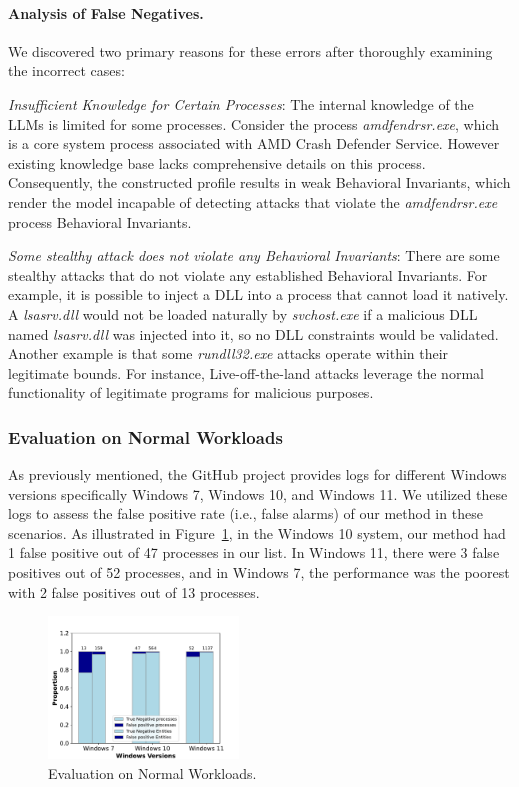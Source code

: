 \paragraph{Analysis of False Negatives.}
We discovered two primary reasons for these errors after thoroughly examining the incorrect cases:


\textit{Insufficient Knowledge for Certain Processes}:  The internal knowledge of the LLMs is limited for some processes. Consider the process \textit{amdfendrsr.exe}, which is a core system process associated with AMD Crash Defender Service. However existing knowledge base lacks comprehensive details on this process. Consequently, the constructed profile results in weak Behavioral Invariants, which render the model incapable of detecting attacks that violate the \textit{amdfendrsr.exe} process Behavioral Invariants.

\textit{Some stealthy attack does not violate any Behavioral Invariants}: There are some stealthy attacks that do not violate any established Behavioral Invariants. For example, it is possible to inject a DLL into a process that cannot load it natively. A \textit{lsasrv.dll} would not be loaded naturally by \textit{svchost.exe} if a malicious DLL named \textit{lsasrv.dll} was injected into it, so no DLL constraints would be validated. Another example is that some \textit{rundll32.exe} attacks operate within their legitimate bounds. For instance, Live-off-the-land\cite{barr2021survivalism} attacks leverage the normal functionality of legitimate programs for malicious purposes.




\subsubsection{Evaluation on Normal Workloads}
As previously mentioned, the GitHub project \cite{evtx-baseline2022} provides logs for different Windows versions specifically Windows 7, Windows 10, and Windows 11. We utilized these logs to assess the false positive rate (i.e., false alarms) of our method in these scenarios.
As illustrated in Figure~\ref{fig-eva-normal}, in the Windows 10 system, our method had 1 false positive out of 47 processes in our list. In Windows 11, there were 3 false positives out of 52 processes, and in Windows 7, the performance was the poorest with 2 false positives out of 13 processes.

\begin{figure}[h]
    \centering
      \includegraphics[width=0.45\textwidth]{figs/normal_chart.pdf}
    \caption{Evaluation on Normal Workloads.}
    \label{fig-eva-normal}
\end{figure}

